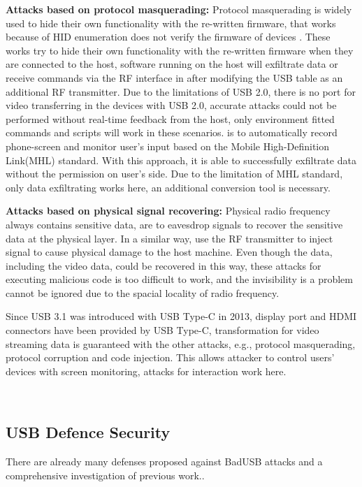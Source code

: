 \textbf{Attacks based on protocol masquerading:} Protocol masquerading is widely used to hide their own functionality with the re-written firmware, that works because of HID enumeration does not verify the firmware of devices \cite{rubber,badusb, rubberducky2020, usbbypassing, iseeyou, usbdriver}. These works try to hide their own functionality with the re-written firmware when they are connected to the host, software running on the host will exfiltrate data or receive commands via the RF interface in \cite{turnip} after modifying the USB table as an additional RF transmitter. Due to the limitations of USB 2.0, there is no port for video transferring in the devices with USB 2.0, accurate attacks could not be performed without real-time feedback from the host, only environment fitted commands and scripts will work in these scenarios. \cite{JFC} is to automatically record phone-screen and monitor user's input based on the Mobile High-Definition Link(MHL) standard. With this approach, it is able to successfully exfiltrate data without the permission on user's side. Due to the limitation of MHL standard, only data exfiltrating works here, an additional conversion tool is necessary. 

\textbf{Attacks based on physical signal recovering:} Physical radio frequency always contains sensitive data, \cite{smartphone, poweremi,revealing,su2017usb, usbgpslocator, bates2014leveraging, badusbhub, usbfinger, side, usbdriver} are to eavesdrop signals to recover the sensitive data at the physical layer. In a similar way, \cite{usbkiller, cable, usbee, turnip} use the RF transmitter to inject signal to cause physical damage to the host machine. Even though the data, including the video data, could be recovered in this way, these attacks for executing malicious code is too difficult to work, and the invisibility is a problem cannot be ignored due to the spacial locality of radio frequency. 

Since USB 3.1 was introduced with USB Type-C in 2013, display port and HDMI connectors have been provided by USB Type-C, transformation for video streaming data is guaranteed with the other attacks, e.g., protocol masquerading,  protocol corruption and code injection. This allows attacker to control users' devices with screen monitoring, attacks for interaction work here.




\\


\subsection{USB Defence Security}
\label{subsec:usb_defence}
There are already many defenses proposed against BadUSB attacks and a comprehensive investigation of previous work.\cite{sok}.

